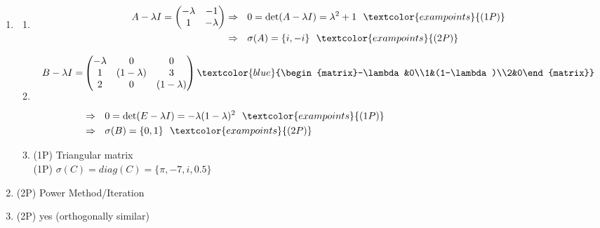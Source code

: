 {\color{solution}
\begin{enumerate}
	\item \begin{enumerate}
		\item 
		\begin{align*}
		A-\lambda I=\begin{pmatrix}-\lambda&-1\\1&-\lambda\end{pmatrix}&\Rightarrow~~0
		=\text{det}(A-\lambda I)
		= \lambda^2 +1~~\textcolor{exampoints}{(1P)}\\
		&\Rightarrow~~\sigma(A)=\{i,-i\}~~\textcolor{exampoints}{(2P)}
		\end{align*}
		\item 
		\begin{align*}
		B-\lambda I=&\begin{pmatrix}-\lambda&0&0\\1&(1-\lambda)&3\\2&0&(1-\lambda)\end{pmatrix}\textcolor{blue}{\begin{matrix}-\lambda&0\\1&(1-\lambda)\\2&0\end{matrix}}\\
		&\\
		&\Rightarrow~~0
		=\text{det}(E-\lambda I)
		=-\lambda(1-\lambda)^2~~\textcolor{exampoints}{(1P)}\\
		&\Rightarrow~~\sigma(B)=\{0,1\}~~\textcolor{exampoints}{( 2P)}
		\end{align*}
		\item \textcolor{exampoints}{(1P)} Triangular matrix\\
	 \textcolor{exampoints}{(1P)}	$ \sigma(C) = diag(C) = \{\pi, -7, i, 0.5\}$
	\end{enumerate}
\item  \textcolor{exampoints}{(2P)} Power Method/Iteration
\item \textcolor{exampoints}{(2P)} yes (orthogonally similar)
\end{enumerate}
}

